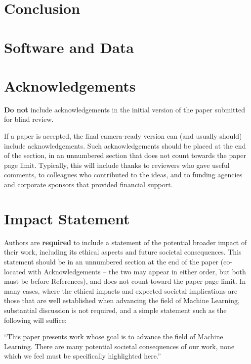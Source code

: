 \documentclass{article}
\theoremstyle{plain}
\theoremstyle{definition}
\theoremstyle{remark}
\begin{document}
\section{Conclusion}





\section*{Software and Data}



\section*{Acknowledgements}

\textbf{Do not} include acknowledgements in the initial version of the paper
submitted for blind review.

If a paper is accepted, the final camera-ready version can (and usually should)
include acknowledgements.  Such acknowledgements should be placed at the end of
the section, in an unnumbered section that does not count towards the paper
page limit. Typically, this will include thanks to reviewers who gave useful
comments, to colleagues who contributed to the ideas, and to funding agencies
and corporate sponsors that provided financial support.

\section*{Impact Statement}

Authors are \textbf{required} to include a statement of the potential broader
impact of their work, including its ethical aspects and future societal
consequences. This statement should be in an unnumbered section at the end of
the paper (co-located with Acknowledgements -- the two may appear in either
order, but both must be before References), and does not count toward the paper
page limit. In many cases, where the ethical impacts and expected societal
implications are those that are well established when advancing the field of
Machine Learning, substantial discussion is not required, and a simple
statement such as the following will suffice:

``This paper presents work whose goal is to advance the field of Machine
Learning. There are many potential societal consequences of our work, none
which we feel must be specifically highlighted here.''
\end{document}
